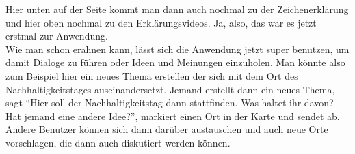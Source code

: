 \begin{itemize}
Hier unten auf der Seite kommt man dann auch nochmal zu der Zeichenerkl{\"a}rung und hier oben nochmal zu den Erkl{\"a}rungsvideos. Ja, also, das war es jetzt erstmal zur Anwendung.\\
Wie man schon erahnen kann, l{\"a}sst sich die Anwendung jetzt super benutzen, um damit Dialoge zu f{\"u}hren oder Ideen und Meinungen einzuholen. Man k{\"o}nnte also zum Beispiel hier ein neues Thema erstellen der sich mit dem Ort des Nachhaltigkeitstages auseinandersetzt. Jemand erstellt dann ein neues Thema, sagt "`Hier soll der Nachhaltigkeitstag dann stattfinden. Was haltet ihr davon? Hat jemand eine andere Idee?"', markiert einen Ort in der Karte und sendet ab. Andere Benutzer k{\"o}nnen sich dann dar{\"u}ber austauschen und auch neue Orte vorschlagen, die dann auch diskutiert werden k{\"o}nnen.
\end{itemize}